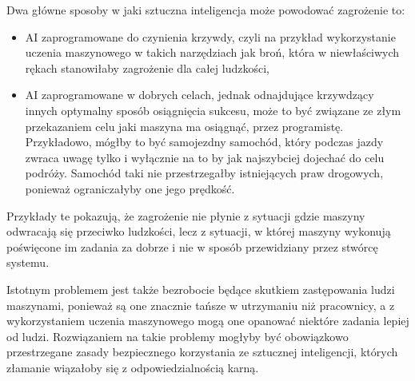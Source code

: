Dwa główne sposoby w jaki sztuczna inteligencja może powodować zagrożenie to:
\begin{itemize}
    \item AI zaprogramowane do czynienia krzywdy, czyli na przykład wykorzystanie uczenia maszynowego
    w takich narzędziach jak broń, która w niewłaściwych rękach stanowiłaby zagrożenie dla całej ludzkości,
    \item AI zaprogramowane w dobrych celach, jednak odnajdujące krzywdzący innych optymalny
    sposób osiągnięcia sukcesu, może to być związane ze złym przekazaniem celu jaki maszyna ma osiągnąć, przez 
    programistę. Przykładowo, mógłby to być samojezdny samochód, który podczas jazdy zwraca uwagę tylko i wyłącznie 
    na to by jak najszybciej dojechać do celu podróży. Samochód taki nie przestrzegałby istniejących praw drogowych,
    ponieważ ograniczałyby one jego prędkość.
\end{itemize}
Przykłady te pokazują, że zagrożenie nie płynie z sytuacji gdzie maszyny odwracają się przeciwko ludzkości, lecz 
z sytuacji, w której maszyny wykonują poświęcone im zadania za dobrze i nie w sposób przewidziany przez 
stwórcę systemu.

Istotnym problemem jest także bezrobocie będące skutkiem zastępowania ludzi maszynami,
ponieważ są one znacznie tańsze w utrzymaniu niż pracownicy, a z wykorzystaniem uczenia
maszynowego mogą one opanować niektóre zadania lepiej od ludzi.
Rozwiązaniem na takie problemy mogłyby być obowiązkowo przestrzegane zasady bezpiecznego korzystania
ze sztucznej inteligencji, których złamanie wiązałoby się z odpowiedzialnością karną.